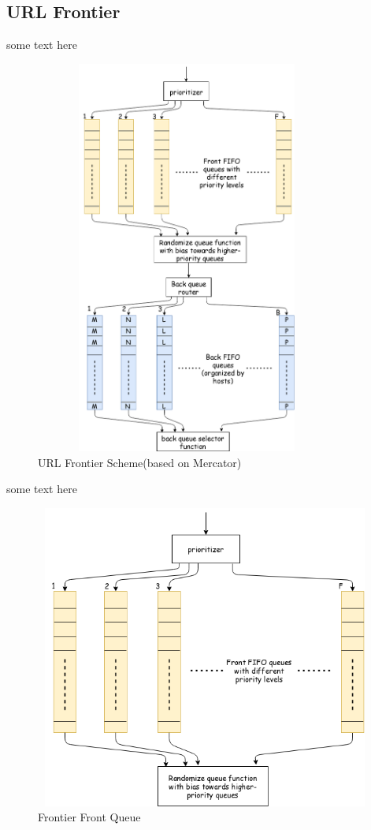 \subsection{URL Frontier}
some text here
\begin{figure}[h!]
  \centering
  \includegraphics[width=10cm,height=13cm,keepaspectratio]{../media/crawler/url-frontier.png}
  \caption{URL Frontier Scheme(based on Mercator)}
  \label{fig:frontier}
\end{figure}

\pagebreak
some text here
\begin{figure}[h!]
  \centering
  \includegraphics[width=13cm,height=10cm,keepaspectratio]{../media/crawler/f-queue.png}
  \caption{Frontier Front Queue}
  \label{fig:fqueue}
\end{figure}

